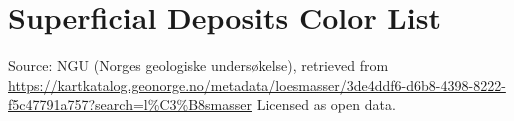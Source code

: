 \chapter{Superficial Deposits Color List}
\label{appendix:superficial_deposits_colors}
Source: NGU (Norges geologiske undersøkelse), retrieved from \url{https://kartkatalog.geonorge.no/metadata/loesmasser/3de4ddf6-d6b8-4398-8222-f5c47791a757?search=l%C3%B8smasser}
Licensed as open data.
